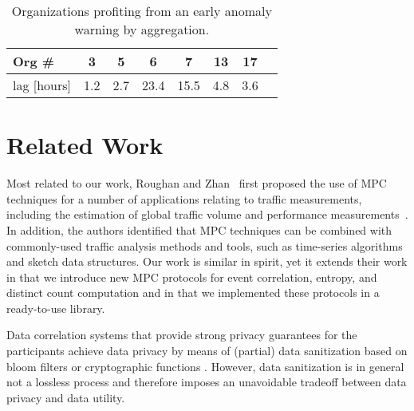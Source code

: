 \documentclass[letterpaper,11pt,onecolumn,titlepage]{article}
\begin{document}
\begin{table}[ht]

\centering
	\begin{tabular}{l|ccccccc}
		 Org \#     & 3    &  5    & 6     &   7   &  13   &  17   \\
		 \hline
		 lag [hours]    & 1.2  &  2.7  & 23.4  &  15.5 &  4.8  &  3.6   
	\end{tabular}

\caption{Organizations profiting from an early anomaly
	warning by aggregation.}

\label{tab:earlywarning}
\end{table}







\section{Related Work}
\label{related}




Most related to our work, Roughan and Zhan~\cite{roughan2006sdd}
first proposed the use of MPC techniques for a number of applications
relating to traffic measurements, including the estimation of
global traffic volume and performance measurements~\cite{roughan2006ppp}.
In addition, the authors identified that MPC techniques can
be combined with commonly-used traffic analysis methods and tools, 
such as time-series algorithms and sketch data structures. Our work
is similar in spirit, yet it extends their work in that we introduce
new MPC protocols for event correlation, entropy, and distinct count computation and
in that we implemented these protocols in a ready-to-use library.

Data correlation systems that provide strong privacy guarantees for the
participants achieve data privacy by means of (partial) data sanitization
based on bloom filters \cite{stolfo2004wae} or cryptographic functions
\cite{lincoln2004alerts,lee2006ppi}. However, data sanitization is in general
not a lossless process and therefore imposes an unavoidable tradeoff between
data privacy and data utility.
\end{document}
